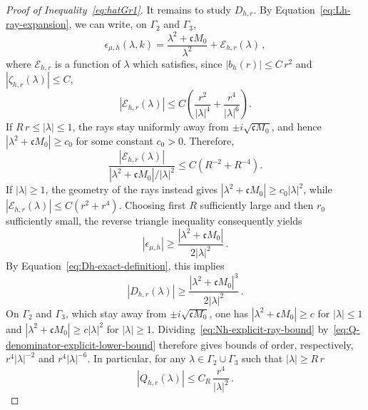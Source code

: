 \documentclass[a4paper,12pt]{amsart} %
\theoremstyle{plain}
\theoremstyle{definition}
\newcommand		{\lt}			{\left}				%
\newcommand		{\rt}			{\right}			%
\renewcommand	{\(}			{\lt(}
\renewcommand	{\)}			{\rt)}
\newcommand		{\n}[1]			{\lt\lvert{#1}\rt\rvert}	%
\newcommand	{\h}			{h}
\newcommand		{\CK}			{\mathfrak{c}}	%
\begin{document}
\begin{proof}[Proof of Inequality~\eqref{eq:hatGr1}]
		It remains to study $D_{\h,r}$. By Equation~\eqref{eq:Lh-ray-expansion}, we can write, on $\Gamma_2$ and $\Gamma_3$,
		\begin{equation*}
			\epsilon_{\mu,\h}(\lambda,k) = \frac{\lambda^2+\CK M_0}{\lambda^2} + \mathcal E_{\h,r}(\lambda) \, ,
		\end{equation*}
		where $\mathcal E_{\h,r}$ is a function of $\lambda$ which satisfies, since $\n{b_\h(r)}\leq C \, r^2$ and $\n{\zeta_{\h,r}(\lambda)}\leq C$,
		\begin{equation*}
			\n{\mathcal E_{\h,r}(\lambda)}
			\leq C\left(\frac{r^2}{\n{\lambda}^4} + \frac{r^4}{\n{\lambda}^6}\right).
		\end{equation*}
		If $R \, r\leq \n{\lambda} \leq 1$, the rays stay uniformly away from $\pm i\sqrt{\CK M_0}$, and hence $\n{\lambda^2+\CK M_0}\geq c_0$ for some constant $c_0 > 0$. Therefore,
		\begin{equation*}
			\frac{\n{\mathcal E_{\h,r}(\lambda)}}{\n{\lambda^2+\CK M_0}/\n{\lambda}^2} \leq C\lt(R^{-2}+R^{-4}\rt).
		\end{equation*}
		If $\n{\lambda}\geq1$, the geometry of the rays instead gives $\n{\lambda^2+\CK M_0}\geq c_0\n{\lambda}^2$, while $\n{\mathcal E_{\h,r}(\lambda)}\leq C\lt(r^2+r^4\rt)$. Choosing first $R$ sufficiently large and then $r_0$ sufficiently small, the reverse triangle inequality consequently yields
		\begin{equation}\label{eq:ray-denominator-comparison}
			\n{\epsilon_{\mu,\h}} \geq \frac{\n{\lambda^2+\CK M_0}}{2 \n{\lambda}^2} \, .
		\end{equation}
		By Equation~\eqref{eq:Dh-exact-definition}, this implies
		\begin{equation}\label{eq:Q-denominator-explicit-lower-bound}
			\n{D_{\h,r}(\lambda)} \geq \frac{\n{\lambda^2+\CK M_0}^3}{2 \n{\lambda}^2} \, .
		\end{equation}
		On $\Gamma_2$ and $\Gamma_3$, which stay away from $\pm i\sqrt{\CK M_0}$, one has $\n{\lambda^2+\CK M_0}\geq c$ for $\n{\lambda}\leq1$ and $\n{\lambda^2+\CK M_0}\geq c\n{\lambda}^2$ for $\n{\lambda}\geq 1$. Dividing~\eqref{eq:Nh-explicit-ray-bound} by~\eqref{eq:Q-denominator-explicit-lower-bound} therefore gives bounds of order, respectively, $r^4\n{\lambda}^{-2}$ and $r^4\n{\lambda}^{-6}$. In particular, for any $\lambda\in\Gamma_2\cup\Gamma_3$ such that $\n{\lambda}\geq R \, r$
		\begin{equation}\label{eq:post-residue-ray-bound}
			\n{Q_{\h,r}(\lambda)} \leq C_R \, \frac{r^4}{\n{\lambda}^2} \, .
		\end{equation}

\end{proof}
\end{document}
